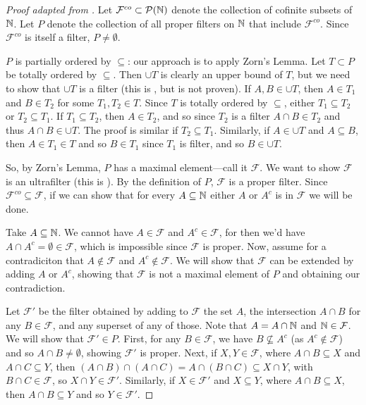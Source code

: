 \begin{proof}[Proof adapted from ]
    Let $\mathcal{F}^{co} \subset \mathcal{P}(\mathbb{N})$ denote the collection of cofinite subsets of $\mathbb{N}$. Let $P$ denote the collection of all proper filters on $\mathbb{N}$ that include $\mathcal{F}^{co}$. Since $\mathcal{F}^{co}$ is itself a filter, $P \neq \emptyset$. 

    $P$ is partially ordered by $\subseteq$: our approach is to apply Zorn's Lemma. Let $T \subset P$ be totally ordered by $\subseteq$. Then $\cup T$ is clearly an upper bound of $T$, but we need to show that $\cup T$ is a filter (this is \cite[Example~2.4(4)]{goldblatt1998}, but is not proven). If $A, B \in \cup T$, then $A \in T_1$ and $B \in T_2$ for some $T_1, T_2 \in T$. Since $T$ is totally ordered by $\subseteq$, either $T_1 \subseteq T_2$ or $T_2 \subseteq T_1$. If $T_1 \subseteq T_2$, then $A \in T_2$, and so since $T_2$ is a filter $A \cap B \in T_2$ and thus $A \cap B \in \cup T$. The proof is similar if $T_2 \subseteq T_1$. Similarly, if $A \in \cup T$ and $A \subseteq B$, then $A \in T_1 \in T$ and so $B \in T_1$ since $T_1$ is  filter, and so $B \in \cup T$.

    So, by Zorn's Lemma, $P$ has a maximal element---call it $\mathcal{F}$. We want to show $\mathcal{F}$ is an ultrafilter (this is \cite[Exercise~2.5(6)]{goldblatt1998}). By the definition of $P$, $\mathcal{F}$ is a proper filter. Since $\mathcal{F}^{co} \subseteq \mathcal{F}$, if we can show that for every $A \subseteq \mathbb{N}$ either $A$ or $A^c$ is in $\mathcal{F}$ we will be done.

    Take $A \subseteq \mathbb{N}$. We cannot have $A \in \mathcal{F}$ and $A^c \in \mathcal{F}$, for then we'd have $A \cap A^c = \emptyset \in \mathcal{F}$, which is impossible since $\mathcal{F}$ is proper. Now, assume for a contradiciton that $A \notin \mathcal{F}$ and $A^c \notin \mathcal{F}$. We will show that $\mathcal{F}$ can be extended by adding $A$ or $A^c$, showing that $\mathcal{F}$ is not a maximal element of $P$ and obtaining our contradiction. 

    Let $\mathcal{F}'$ be the filter obtained by adding to $\mathcal{F}$ the set $A$, the intersection $A \cap B$ for any $B \in \mathcal{F}$, and any superset of any of those. Note that $A = A \cap \mathbb{N}$ and $\mathbb{N} \in \mathcal{F}$. We will show that $\mathcal{F}' \in P$. First, for any $B \in \mathcal{F}$, we have $B \nsubseteq A^c$ (as $A^c \notin \mathcal{F}$) and so $A \cap B \neq \emptyset$, showing $\mathcal{F}'$ is proper. Next, if $X, Y \in \mathcal{F}$, where $A \cap B \subseteq X$ and $A \cap C \subseteq Y$, then $(A \cap B) \cap (A \cap C) = A \cap (B \cap C) \subseteq X \cap Y$, with $B \cap C \in \mathcal{F}$, so $X \cap Y \in \mathcal{F}'$. Similarly, if $X \in \mathcal{F}'$ and $X \subseteq Y$, where $A \cap B \subseteq X$, then $A \cap B \subseteq Y$ and so $Y \in \mathcal{F}'$.   

    
\end{proof}

